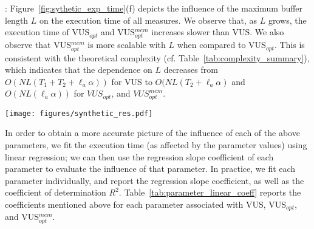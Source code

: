 \vspace{0.2cm}
\noindent {\bf [Influence of $L$]}: Figure~\ref{fig:sythetic_exp_time}(f) depicts the influence of the maximum buffer length $L$ on the execution time of all measures. 
We observe that, as $L$ grows, the execution time of VUS$_{opt}$ and VUS$_{opt}^{mem}$ increases slower than VUS. 
We also observe that VUS$_{opt}^{mem}$ is more scalable with $L$ when compared to VUS$_{opt}$. 
This is consistent with the theoretical complexity (cf. Table~\ref{tab:complexity_summary}), which indicates that the dependence on $L$ decreases from $O(NL(T_1+T_2+\ell_a \alpha))$ for VUS to $O(NL(T_2+\ell_a \alpha)$ and $O(NL(\ell_a \alpha))$ for $VUS_{opt}$, and $VUS_{opt}^{mem}$.





\begin{figure*}[tb]
  \centering
  \texttt{[image: figures/synthetic\_res.pdf]}
  \caption{Execution time of VUS, R-AUC, AUC-based measures when we vary the parameters listed in Table~\ref{tab:parameter_range_time}. The solid lines correspond to the average execution time over 10 runs. The colored envelopes are to the standard deviation.}
  \label{fig:sythetic_exp_time}
\end{figure*}


\vspace{0.2cm}
In order to obtain a more accurate picture of the influence of each of the above parameters, we fit the execution time (as affected by the parameter values) using linear regression; we can then use the regression slope coefficient of each parameter to evaluate the influence of that parameter. 
In practice, we fit each parameter individually, and report the regression slope coefficient, as well as the coefficient of determination $R^2$.
Table~\ref{tab:parameter_linear_coeff} reports the coefficients mentioned above for each parameter associated with VUS, VUS$_{opt}$, and VUS$_{opt}^{mem}$.



